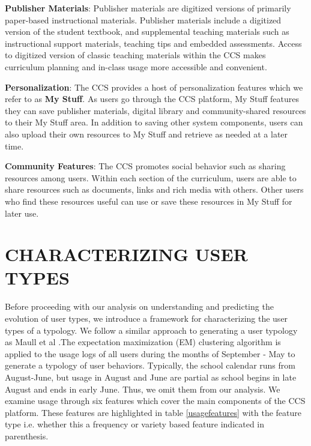 \documentclass{acm_proc_article-sp}
\begin{document}
\textbf{Publisher Materials}:
Publisher materials are digitized versions of primarily paper-based instructional materials. Publisher materials include a digitized version of the student textbook, and supplemental teaching materials such as instructional support materials, teaching tips and embedded assessments. Access to digitized version of classic teaching materials within the CCS makes curriculum planning and in-class usage more accessible and convenient.

\textbf{Personalization}:
The CCS provides a host of personalization features which we refer to as \textbf{My Stuff}. As users go through the CCS platform, My Stuff features they can save publisher materials, digital library and community-shared resources to their My Stuff area. In addition to saving other system components, users can also upload their own resources to My Stuff and retrieve as needed at a later time.

\textbf{Community Features}:
The CCS promotes social behavior such as sharing resources among users. Within each section of the curriculum, users are able to share resources such as documents, links and rich media with others. Other users who find these resources useful can use or save these resources in My Stuff for later use.

\section{CHARACTERIZING USER TYPES}\label{charusertypes}
Before proceeding with our analysis on understanding and predicting the evolution of user types, we introduce a framework for characterizing the user types of a typology. We follow a similar approach to generating a user typology as Maull et al \cite{maullunderstanding}.The expectation maximization (EM) clustering algorithm is applied to the usage logs of all users during the months of September - May to generate a typology of user behaviors. Typically, the school calendar runs from August-June, but usage in August and June are partial as school begins in late August and ends in early June. Thus, we omit them from our analysis. We examine usage through six  features which cover the main components of the CCS platform. These features are highlighted in table \ref{usagefeatures} with the feature type i.e. whether this a frequency or variety based feature indicated in parenthesis.
\end{document}
